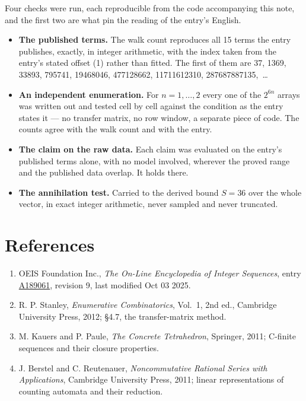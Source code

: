 \documentclass[11pt]{article}
\theoremstyle{definition}
\begin{document}
Four checks were run, each reproducible from the code accompanying this note, and the first two are what pin the reading of the entry's English.

\begin{itemize}

\item {\bfseries The published terms.} The walk count reproduces all 15 terms the entry publishes, exactly, in integer arithmetic, with the index taken from the entry's stated offset (1) rather than fitted. The first of them are 37, 1369, 33893, 795741, 19468046, 477128662, 11711612310, 287687887135,~\dots

\item {\bfseries An independent enumeration.} For $n = 1,\dots,2$ every one of the $2^{6n}$ arrays was written out and tested cell by cell against the condition as the entry states it --- no transfer matrix, no row window, a separate piece of code. The counts agree with the walk count and with the entry.

\item {\bfseries The claim on the raw data.} Each claim was evaluated on the entry's published terms alone, with no model involved, wherever the proved range and the published data overlap. It holds there.

\item {\bfseries The annihilation test.} Carried to the derived bound $S = 36$ over the whole vector, in exact integer arithmetic, never sampled and never truncated.

\end{itemize}

\section{References}

\begin{enumerate}

\item OEIS Foundation Inc., \emph{The On-Line Encyclopedia of Integer Sequences}, entry \href{https://oeis.org/A189061}{A189061}, revision 9, last modified Oct 03 2025.

\item R. P. Stanley, \emph{Enumerative Combinatorics}, Vol.~1, 2nd ed., Cambridge University Press, 2012; \S4.7, the transfer-matrix method.

\item M. Kauers and P. Paule, \emph{The Concrete Tetrahedron}, Springer, 2011; C-finite sequences and their closure properties.

\item J. Berstel and C. Reutenauer, \emph{Noncommutative Rational Series with Applications}, Cambridge University Press, 2011; linear representations of counting automata and their reduction.

\end{enumerate}
\end{document}
